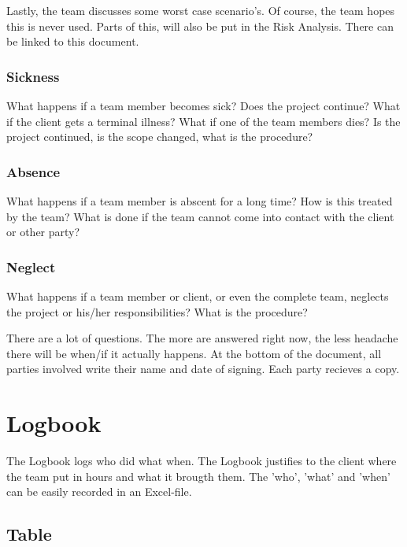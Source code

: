 \documentclass[10pt]{report}
\begin{document}
Lastly, the team discusses some worst case scenario's. Of course, the team hopes this is never used. Parts of this, will also be put in the Risk Analysis. There can be linked to this document.

\subsubsection{Sickness}

What happens if a team member becomes sick? Does the project continue? What if the client gets a terminal illness? What if one of the team members dies? Is the project continued, is the scope changed, what is the procedure?

\subsubsection{Absence}

What happens if a team member is abscent for a long time? How is this treated by the team? What is done if the team cannot come into contact with the client or other party?

\subsubsection{Neglect}

What happens if a team member or client, or even the complete team, neglects the project or his/her responsibilities? What is the procedure?

\bigskip

There are a lot of questions. The more are answered right now, the less headache there will be when/if it actually happens. At the bottom of the document, all parties involved write their name and date of signing. Each party recieves a copy.

\newpage

\section{Logbook}

The Logbook logs who did what when. The Logbook justifies to the client where the team put in hours and what it brougth them. The 'who', 'what' and 'when' can be easily recorded in an Excel-file.

\subsection{Table}
\end{document}
